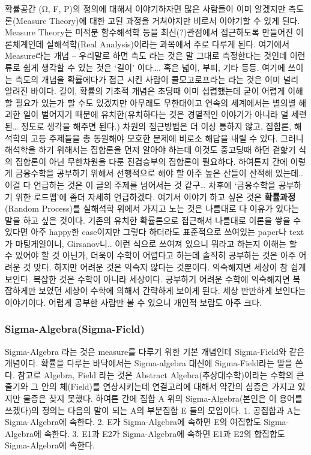 \documentclass[
]{book}
\begin{document}
{{{확률공간 (Ω, F, P)의 정의에 대해서 이야기하자면 많은 사람들이 이미 알겠지만 측도론(Measure Theory)에 대한 고된 과정을 거쳐야지만 비로서 이야기할 수 있게 된다. Measure Theory는 미적분 함수해석학 등을 최신(?)관점에서 접근하도록 만들어진 이론체계인데 실해석학(Real Analysis)이라는 과목에서 주로 다루게 된다. 여기에서 Measure라는 개념 -- 우리말로 하면 측도 라는 것은 말 그대로 측정한다는 것인데 이런 류로 쉽게 생각할 수 있는 것은 `길이' 이다\ldots. 혹은 넓이, 부피, 기타 등등. 여기에 쓰이는 측도의 개념을 확률에다가 접근 시킨 사람이 콜모고로프라는 라는 것은 이미 널리 알려진 바이다. 길이, 확률의 기초적 개념은 초딩때 이미 섭렵했는데 굳이 어렵게 이해할 필요가 있는가 할 수도 있겠지만 아무래도 무한대이고 연속의 세계에서는 별의별 해괴한 일이 벌어지기 때문에 유치한(유치하다는 것은 경멸적인 이야기가 아니라 덜 세련된\ldots{} 정도로 생각을 해주면 된다.) 차원의 접근방법은 더 이상 통하지 않고, 집합론, 해석학의 고등 주제들을 총 동원해야 모호한 문제에 비로소 해답을 내릴 수 있다. 그러니 해석학을 하기 위해서는 집합론을 먼저 알아야 하는데 이것도 중고딩때 하던 겉핥기 식의 집합론이 아닌 무한차원을 다룬 진검승부의 집합론이 필요하다. 하여튼지 간에 이렇게 금융수학을 공부하기 위해서 선행적으로 해야 할 아주 높은 산들이 산적해 있는데.. 이걸 다 언급하는 것은 이 글의 주제를 넘어서는 것 같구\ldots{} 차후에 `금융수학을 공부하기 위한 로드맵'에 좀더 자세히 언급하겠다. 여기서 이야기 하고 싶은 것은 \textbf{확률과정}(Random Process)를 실해석학 위에서 가지고 노는 것은 나름대로 다 이유가 있다는 말을 하고 싶은 것이다. 기존의 유치한 확률론으로 접근해서 나름대로 이론을 쌓을 수 있다면 아주 happy한 case이지만 그렇다 하더라도 표준적으로 쓰여있는 paper나 text가 마팅게일이니, Girsanov니.. 이런 식으로 쓰여져 있으니 뭐라고 하는지 이해는 할 수 있어야 할 것 아닌가, 더욱이 수학이 어렵다고 하는데 솔직히 공부하는 것은 아주 어려운 것 맞다. 하지만 어려운 것은 익숙지 않다는 것뿐이다. 익숙해지면 세상이 참 쉽게 보인다. 복잡한 것은 수학이 아니라 세상이다. 공부하기 어려운 수학에 익숙해지면 복잡하게만 보였던 세상이 수학에 의해서 간략하게 보이게 된다. 세상 만만하게 보인다는 이야기이다. 어렵게 공부한 사람만 볼 수 있으니 개인적 보람도 아주 크다.

\hypertarget{sigma-algebrasigma-field}{%
\subsubsection{Sigma-Algebra(Sigma-Field)}\label{sigma-algebrasigma-field}}

Sigma-Algebra 라는 것은 measure를 다루기 위한 기본 개념인데 Sigma-Field와 같은 개념이다. 확률을 다루는 바닥에서는 Sigma-algebra 대신에 Sigma-Field라는 말을 쓴다. 참고로 Algebra, Field 라는 것은 Abstract Algebra(추상대수학)이라는 수학의 큰 줄기와 그 안의 체(Field)를 연상시키는데 연결고리에 대해서 약간의 심증은 가지고 있지만 물증은 찾지 못했다. 하여튼 간에 집합 A 위의 Sigma-Algebra(본인은 이 용어를 쓰겠다)의 정의는 다음의 말이 되는 A의 부분집합 E 들의 모임이다.
1. 공집합과 A는 Sigma-Algebra에 속한다.
2. E가 Sigma-Algebra에 속하면 E의 여집합도 Sigma-Algebra에 속한다.
3. E1과 E2가 Sigma-Algebra에 속하면 E1과 E2의 합집합도 Sigma-Algebra에 속한다.

}}}
\end{document}
